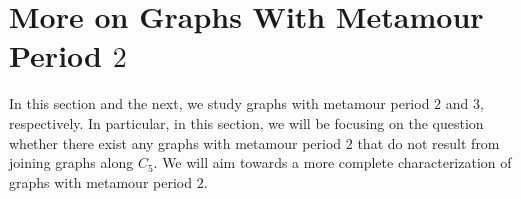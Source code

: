 \documentclass[12pt]{amsart}
\newtheorem{theorem}{Theorem}[section]
\theoremstyle{definition}
\theoremstyle{remark}
\numberwithin{equation}{section}
\numberwithin{figure}{section}
\begin{document}




\section{More on Graphs With Metamour Period $2$}  \label{sec: per2}

In this section and the next, we study graphs with metamour period $2$ and $3$, respectively. In particular, in this section, we will be focusing on the question whether there exist any graphs
with metamour period $2$ that do not result from joining graphs along $C_5$. We will aim towards a
more complete characterization of graphs with metamour period $2$.
\end{document}
